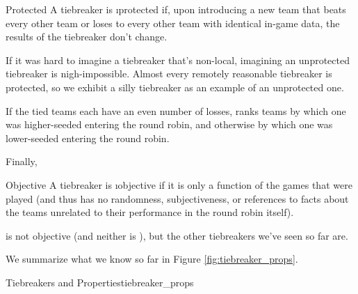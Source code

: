 {    \begin{definition}{Protected}{}
        A tiebreaker is \i{protected} if, upon introducing a new team that beats every other team or loses to every other team with identical in-game data, the results of the tiebreaker don't change.
    \end{definition}

    If it was hard to imagine a tiebreaker that's non-local, imagining an unprotected tiebreaker is nigh-impossible. Almost every remotely reasonable tiebreaker is protected, so we exhibit a silly tiebreaker as an example of an unprotected one.

    \begin{definition}{}{}
        If the tied teams each have an even number of losses,  ranks teams by which one was higher-seeded entering the round robin, and otherwise by which one was lower-seeded entering the round robin.
    \end{definition}

    Finally,

    \begin{definition}{Objective}{}
        A tiebreaker is \i{objective} if it is only a function of the games that were played (and thus has no randomness, subjectiveness, or references to facts about the teams unrelated to their performance in the round robin itself).
    \end{definition}
  
     is not objective (and neither is ), but the other tiebreakers we've seen so far are.

    We summarize what we know so far in Figure \ref{fig:tiebreaker_props}.

    \begin{figg}{Tiebreakers and Properties}{tiebreaker_props}
        \begin{center}
        \end{center}
    \end{figg}

}
